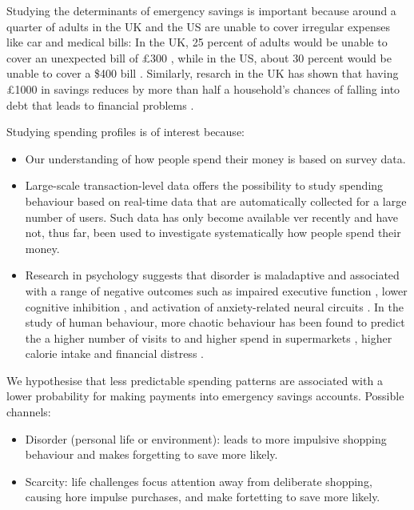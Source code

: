 Studying the determinants of emergency savings is important because around a
quarter of adults in the UK and the US are unable to cover irregular expenses
like car and medical bills: In the UK, 25 percent of adults would be unable to
cover an unexpected bill of \pounds300 \citep{philipps2021supporting}, while in
the US, about 30 percent would be unable to cover a \$400 bill
\citep{fed2022economic}. Similarly, resarch in the UK has shown that having
\pounds1000 in savings reduces by more than half a household's chances of
falling into debt that leads to financial problems
\citep{philipps2021supporting}.


Studying spending profiles is of interest because:
\begin{itemize}

    \item Our understanding of how people spend their money is based on survey
        data.

    \item Large-scale transaction-level data offers the possibility to study
        spending behaviour based on real-time data that are automatically
        collected for a large number of users. Such data has only become
        available ver recently and have not, thus far, been used to investigate
        systematically how people spend their money.

    \item Research in psychology suggests that disorder is maladaptive and
        associated with a range of negative outcomes such as impaired executive
        function \citep{vernon2016predictors}, lower cognitive inhibition
        \citep{mittal2015cognitive}, and activation of anxiety-related neural
        circuits \citep{hirsh2012psychological}. In the study of human
        behaviour, more chaotic behaviour has been found to predict the a
        higher number of visits to and higher spend in supermarkets
        \citep{guidotti2015behavioral}, higher calorie intake
        \citep{skatova2019those} and financial distress
        \citep{muggleton2020evidence}.

\end{itemize}


We hypothesise that less predictable spending patterns are associated with a
lower probability for making payments into emergency savings accounts. Possible
channels:
\begin{itemize}
    \item Disorder (personal life or environment): leads to more impulsive
        shopping behaviour and makes forgetting to save more likely.

    \item Scarcity: life challenges focus attention away from deliberate
        shopping, causing hore impulse purchases, and make fortetting to save
        more likely.
\end{itemize}



